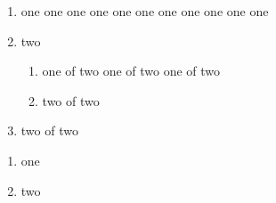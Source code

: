 \documentclass{report}
\begin{document}
\begin{enumerate}[EX i.]
\item one one one one one one one
one one one one\label{LA}
\item two
\begin{enumerate}[{example} a)]
\item one of two one of two
one of two\label{LB}
\item two of two
\end{enumerate}
\item two of two
\end{enumerate}
\begin{enumerate}[{A}-1]
\item one\label{LC}
\item two
\end{enumerate}
\end{document}
